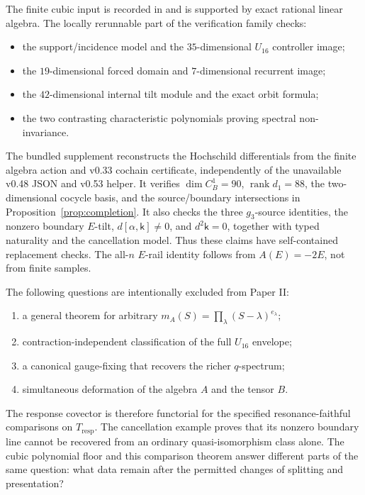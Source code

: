 \documentclass[11pt]{amsart}
\newcommand{\rank}{\operatorname{rank}}
\begin{document}
The finite cubic input is recorded in \cite{CubicRecords} and is supported by exact
rational linear algebra. The locally rerunnable part of the verification family checks:

\begin{itemize}
\item the support/incidence model and the \(35\)-dimensional \(U_{16}\) controller image;
\item the \(19\)-dimensional forced domain and \(7\)-dimensional recurrent image;

\item the \(42\)-dimensional internal tilt module and the exact orbit formula;
\item the two contrasting characteristic polynomials proving spectral non-invariance.
\end{itemize}

The bundled supplement reconstructs the Hochschild differentials from the finite
algebra action and v0.33 cochain certificate, independently of the unavailable
v0.48 JSON and v0.53 helper. It verifies \(\dim C^1_B=90\), \(\rank d_1=88\),
the two-dimensional cocycle basis, and the source/boundary intersections in
Proposition~\ref{prop:completion}. It also checks the three \(g_3\)-source identities,
the nonzero boundary \(E\)-tilt, \(d[\alpha,\mathsf k]\ne0\), and
\(d^2\mathsf k=0\), together with typed naturality and the cancellation model.
Thus these claims have self-contained replacement checks. The all-\(n\)
\(E\)-rail identity follows from \(A(E)=-2E\), not from finite samples.

The following questions are intentionally excluded from Paper II:

\begin{enumerate}[label=(\arabic*)]
\item a general theorem for arbitrary \(m_A(S)=\prod_\lambda(S-\lambda)^{e_\lambda}\);

\item contraction-independent classification of the full \(U_{16}\) envelope;
\item a canonical gauge-fixing that recovers the richer \(q\)-spectrum;
\item simultaneous deformation of the algebra \(A\) and the tensor \(B\).
\end{enumerate}

The response covector is therefore functorial for the specified resonance-faithful
comparisons on \(T_{\mathrm{resp}}\). The cancellation example proves that its
nonzero boundary line cannot be recovered from an ordinary quasi-isomorphism class
alone. The cubic polynomial floor and this comparison theorem answer different
parts of the same question: what data remain after the permitted changes of
splitting and presentation?
\end{document}
